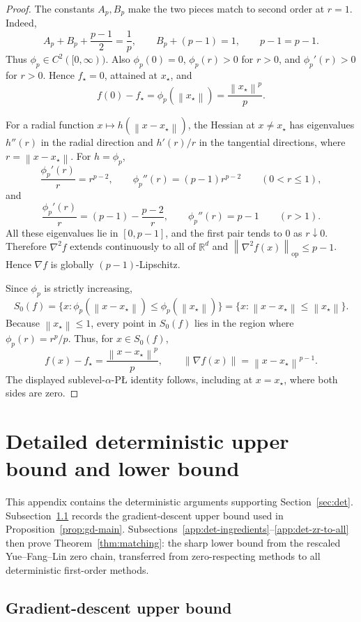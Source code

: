 \documentclass[11pt]{article}
\newcommand{\R}{\mathbb{R}}
\newcommand{\norm}[1]{\left\lVert #1\right\rVert}
\begin{document}
\begin{proof}
The constants \(A_p,B_p\) make the two pieces match to second order at \(r=1\). Indeed,
\[
A_p+B_p+\frac{p-1}{2}=\frac1p,\qquad
B_p+(p-1)=1,\qquad
p-1=p-1.
\]
Thus \(\phi_p\in C^2([0,\infty))\). Also \(\phi_p(0)=0\), \(\phi_p(r)>0\) for \(r>0\), and
\(\phi_p'(r)>0\) for \(r>0\). Hence \(f_\star=0\), attained at \(x_\star\), and
\[
f(0)-f_\star=\phi_p(\norm{x_\star})=\frac{\norm{x_\star}^p}{p}.
\]

For a radial function \(x\mapsto h(\norm{x-x_\star})\), the Hessian at \(x\ne x_\star\) has eigenvalues \(h''(r)\)
in the radial direction and \(h'(r)/r\) in the tangential directions, where \(r=\norm{x-x_\star}\). For \(h=\phi_p\),
\[
\frac{\phi_p'(r)}{r}=r^{p-2},\qquad \phi_p''(r)=(p-1)r^{p-2}
\qquad (0<r\le 1),
\]
and
\[
\frac{\phi_p'(r)}{r}=(p-1)-\frac{p-2}{r},\qquad \phi_p''(r)=p-1
\qquad (r>1).
\]
All these eigenvalues lie in \([0,p-1]\), and the first pair tends to \(0\) as \(r\downarrow0\). Therefore
\(\nabla^2 f\) extends continuously to all of \(\R^d\) and
\(\norm{\nabla^2 f(x)}_{\mathrm{op}}\le p-1\). Hence \(\nabla f\) is globally \((p-1)\)-Lipschitz.

Since \(\phi_p\) is strictly increasing,
\[
S_0(f)
=
\{x:\phi_p(\norm{x-x_\star})\le \phi_p(\norm{x_\star})\}
=
\{x:\norm{x-x_\star}\le \norm{x_\star}\}.
\]
Because \(\norm{x_\star}\le1\), every point in \(S_0(f)\) lies in the region where
\(\phi_p(r)=r^p/p\). Thus, for \(x\in S_0(f)\),
\[
f(x)-f_\star=\frac{\norm{x-x_\star}^p}{p},
\qquad
\norm{\nabla f(x)}=\norm{x-x_\star}^{p-1}.
\]
The displayed sublevel-\(\alpha\)-P\L{} identity follows, including at \(x=x_\star\), where both sides are zero.
\end{proof}

\section{Detailed deterministic upper bound and lower bound}
\label{app:deterministic}

This appendix contains the deterministic arguments supporting Section~\ref{sec:det}.
Subsection~\ref{app:gd-upper} records the gradient-descent upper bound used in Proposition~\ref{prop:gd-main}.
Subsections~\ref{app:det-ingredients}--\ref{app:det-zr-to-all} then prove Theorem~\ref{thm:matching}: the sharp lower
bound from the rescaled Yue--Fang--Lin zero chain, transferred from zero-respecting methods to all deterministic
first-order methods.

\subsection{Gradient-descent upper bound}
\label{app:gd-upper}
\end{document}
